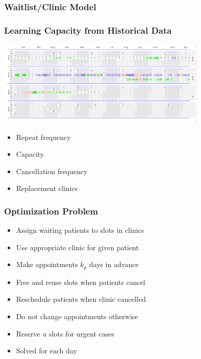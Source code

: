 
\begin{frame}
\frametitle{Waitlist/Clinic Model}

\end{frame}


\begin{frame}
\frametitle{Learning Capacity from Historical Data}
\includegraphics[width=10cm]{imagesoutpatient/samplecliniccalendar}
{\small
\begin{itemize}
\item Repeat frequency
\item Capacity
\item Cancellation frequency
\item Replacement clinics
\end{itemize}
}
\end{frame}

\begin{frame}
\frametitle{Optimization Problem}
\begin{itemize}
\item Assign waiting patients to slots in clinics
\item Use appropriate clinic for given patient
\item Make appointments $k_p$ days in advance
\item Free and reuse slots when patients cancel
\item Reschedule patients when clinic cancelled
\item Do not change appointments otherwise
\item Reserve $u$ slots for urgent cases
\item Solved for each day
\end{itemize}
\end{frame}

